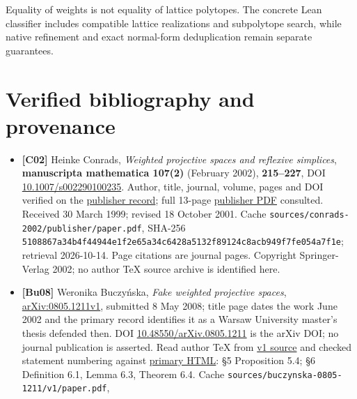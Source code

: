 \documentclass[11pt,a4paper,oneside]{report}
\providecommand{\tightlist}{%
  \setlength{\itemsep}{0pt}\setlength{\parskip}{0pt}}
\begin{document}
Equality of weights is not equality of lattice polytopes. The concrete
Lean classifier includes compatible lattice realizations and subpolytope
search, while native refinement and exact normal-form deduplication
remain separate guarantees.

\section{Verified bibliography and
provenance}\label{weight-systems-and-wps--verified-bibliography-and-provenance}

\begin{itemize}
\tightlist
\item
  \textbf{{[}C02{]}} Heinke Conrads, \emph{Weighted projective spaces
  and reflexive simplices}, \textbf{manuscripta mathematica 107(2)}
  (February 2002), \textbf{215--227}, DOI
  \href{https://doi.org/10.1007/s002290100235}{10.\allowbreak{}1007/\allowbreak{}s0022901\allowbreak{}00235}.
  Author, title, journal, volume, pages and DOI verified on the
  \href{https://link.springer.com/article/10.1007/s002290100235}{publisher
  record}; full 13-page
  \href{https://link.springer.com/content/pdf/10.1007/s002290100235.pdf}{publisher
  PDF} consulted. Received 30 March 1999; revised 18 October 2001. Cache
  \texttt{sources/\allowbreak{}conrads-\allowbreak{}2002/\allowbreak{}publishe\allowbreak{}r/\allowbreak{}paper.\allowbreak{}pdf},
  SHA-256
  \texttt{5108867a\allowbreak{}34b4f449\allowbreak{}44e1f2e6\allowbreak{}5a34c642\allowbreak{}8a5132f8\allowbreak{}9124c8ac\allowbreak{}b949f7fe\allowbreak{}054a7f1e};
  retrieval 2026-10-14. Page citations are journal pages. Copyright
  Springer-Verlag 2002; no author TeX source archive is identified here.
\item
  \textbf{{[}Bu08{]}} Weronika Buczyńska, \emph{Fake weighted projective
  spaces},
  \href{https://arxiv.org/abs/0805.1211v1}{arXiv:\allowbreak{}0805.\allowbreak{}1211v1},
  submitted 8 May 2008; title page dates the work June 2002 and the
  primary record identifies it as a Warsaw University master's thesis
  defended then. DOI
  \href{https://doi.org/10.48550/arXiv.0805.1211}{10.\allowbreak{}48550/\allowbreak{}arXiv.\allowbreak{}0805.\allowbreak{}1211}
  is the arXiv DOI; no journal publication is asserted. Read author TeX
  from \href{https://arxiv.org/src/0805.1211v1}{v1 source} and checked
  statement numbering against
  \href{https://arxiv.org/html/0805.1211v1}{primary HTML}: §5
  Proposition 5.4; §6 Definition 6.1, Lemma 6.3, Theorem 6.4. Cache
  \texttt{sources/\allowbreak{}buczynsk\allowbreak{}a-\allowbreak{}0805-\allowbreak{}1211/\allowbreak{}v1/\allowbreak{}paper.\allowbreak{}pdf},

\end{itemize}
\end{document}
